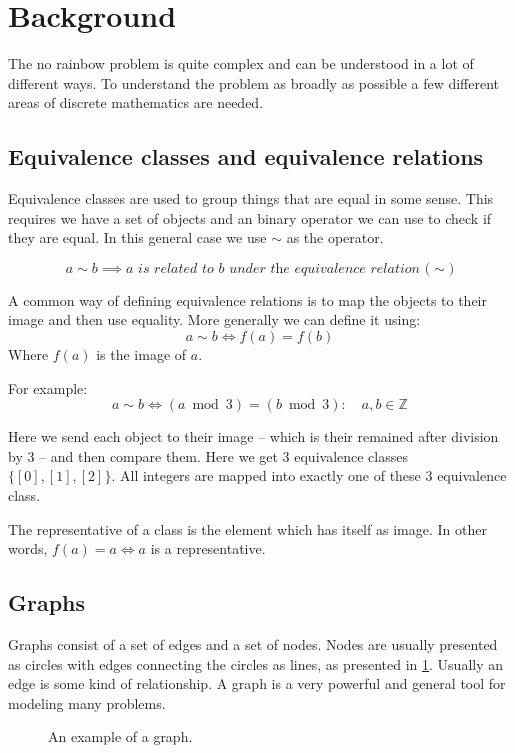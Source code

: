 \section{Background}
The no rainbow problem is quite complex and can be understood in a lot of different ways.
To understand the problem as broadly as possible a few different areas of discrete mathematics are needed.

\subsection{Equivalence classes and equivalence relations}
Equivalence classes are used to group things that are equal in some sense.
This requires we have a set of objects and an binary operator we can use to check if they are equal.
In this general case we use $\sim$ as the operator.

$$
  a \sim b \implies \textit{$a$ is related to $b$ under the equivalence relation ($\sim$)}
$$

A common way of defining equivalence relations is to map the objects to their image and then use equality.
More generally we can define it using:
$$
  a \sim b \iff f(a) = f(b)
$$
Where $f(a)$ is the image of $a$.

For example:
$$
  a \sim b \iff (a \bmod 3) = (b \bmod 3) : \quad a, b \in \mathds{Z}
$$

Here we send each object to their image -- which is their remained after division by 3 -- and then compare them.
Here we get 3 equivalence classes $\{[0], [1], [2]\}$. All integers are mapped into exactly one of these 3 equivalence class.

The representative of a class is the element which has itself as image. In other words, $f(a) = a \iff a$ is a representative.
\cite[Section 7.3]{sourceArmen} \cite[Section 1.2]{sourceAATA}

\subsection{Graphs}
Graphs consist of a set of edges and a set of nodes.
Nodes are usually presented as circles with edges connecting the circles as lines, as presented in \ref{figGraphExample}.
Usually an edge is some kind of relationship. 
A graph is a very powerful and general tool for modeling many problems.

\begin{center}
\begin{figure}[h]
\centering
{}
  \caption{An example of a graph.}
  \label{figGraphExample}
\end{figure}
\end{center}


